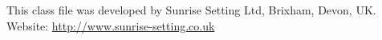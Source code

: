 \documentclass[Afour,sageh,times]{includes/tex/sagej}
\begin{document}
\begin{acks}
This class file was developed by Sunrise Setting Ltd, Brixham, Devon, UK. \\
Website: \url{http://www.sunrise-setting.co.uk}
\end{acks}


\end{document}
